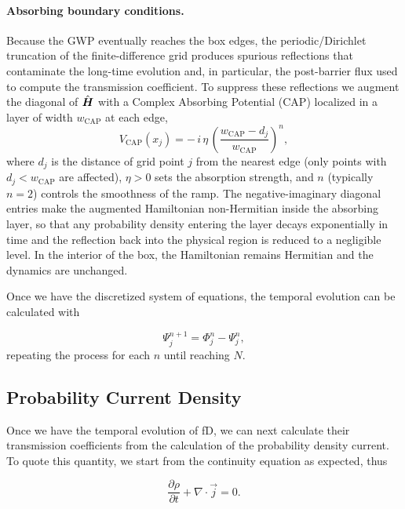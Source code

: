\paragraph{Absorbing boundary conditions.}
Because the GWP eventually reaches the box edges, the periodic/Dirichlet truncation of the finite-difference grid produces spurious reflections that contaminate the long-time evolution and, in particular, the post-barrier flux used to compute the transmission coefficient. To suppress these reflections we augment the diagonal of $\hat{\mbox{\boldmath $H$}}$ with a Complex Absorbing Potential (CAP) localized in a layer of width $w_{\mathrm{CAP}}$ at each edge,
\begin{equation}
    \label{eq:CAP}
    V_{\mathrm{CAP}}(x_j) = -\,i\,\eta\,\left(\frac{w_{\mathrm{CAP}}-d_j}{w_{\mathrm{CAP}}}\right)^{n},
\end{equation}
\noindent where $d_j$ is the distance of grid point $j$ from the nearest edge (only points with $d_j<w_{\mathrm{CAP}}$ are affected), $\eta>0$ sets the absorption strength, and $n$ (typically $n=2$) controls the smoothness of the ramp. The negative-imaginary diagonal entries make the augmented Hamiltonian non-Hermitian inside the absorbing layer, so that any probability density entering the layer decays exponentially in time and the reflection back into the physical region is reduced to a negligible level. In the interior of the box, the Hamiltonian remains Hermitian and the dynamics are unchanged.

Once we have the discretized system of equations, the temporal evolution can be calculated with

\begin{equation}
    \label{eq:siguienteTiempo}
    \Psi_j^{n+1}=\Phi_j^n-\Psi_j^n,
\end{equation}
repeating the process for each $n$ until reaching $N$.

\subsection{Probability Current Density}\label{subsec:probability-current-density}

Once we have the temporal evolution of fD, we can next calculate their transmission coefficients from the calculation of the probability density current. To quote this quantity, we start from the continuity equation as expected, thus

\begin{equation}
    \label{eq:continuidad}
    \frac{\partial\rho}{\partial t} + \nabla\cdot\vec{j} = 0.
\end{equation}


